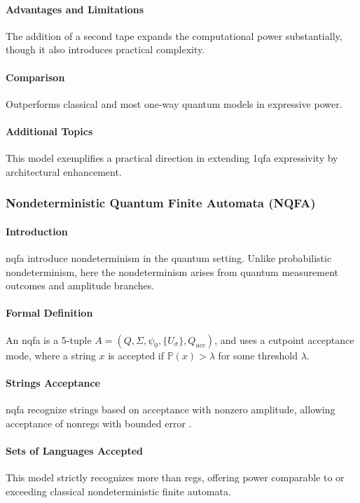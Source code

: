 \paragraph{Advantages and Limitations}
The addition of a second tape expands the computational power substantially, though it also introduces practical complexity.

\paragraph{Comparison}
Outperforms classical and most one-way quantum models in expressive power.

\paragraph{Additional Topics}
This model exemplifies a practical direction in extending \gls{1qfa} expressivity by architectural enhancement.

\subsubsection{Nondeterministic Quantum Finite Automata (NQFA)}
\paragraph{Introduction}
\gls{nqfa} introduce nondeterminism in the quantum setting. Unlike probabilistic nondeterminism, here the nondeterminism arises from quantum measurement outcomes and amplitude branches.

\paragraph{Formal Definition}
An \gls{nqfa} is a 5-tuple \( A = (Q, \Sigma, \psi_0, \{U_\sigma\}, Q_{acc}) \), and uses a cutpoint acceptance mode, where a string \( x \) is accepted if \( \mathbb{P}(x) > \lambda \) for some threshold \( \lambda \).

\paragraph{Strings Acceptance}
\gls{nqfa} recognize strings based on acceptance with nonzero amplitude, allowing acceptance of non\glspl{reg} with bounded error \cite{yakaryilmaz2009languages}.

\paragraph{Sets of Languages Accepted}
This model strictly recognizes more than \glspl{reg}, offering power comparable to or exceeding classical nondeterministic finite automata.

